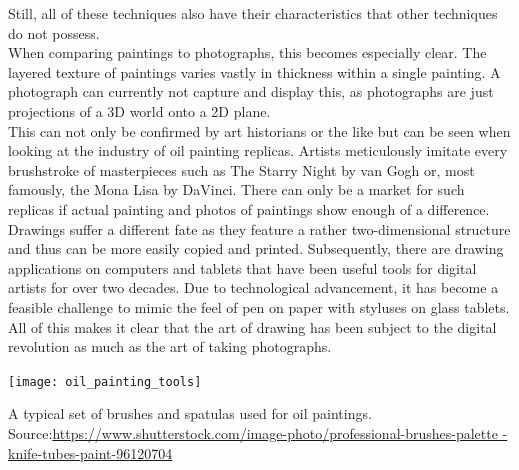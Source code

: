 Still, all of these techniques also have their characteristics that other techniques do not possess. \\
When comparing paintings to photographs, this becomes especially clear.
The layered texture of paintings varies vastly in thickness within a single painting.
A photograph can currently not capture and display this, as photographs are just projections of a 3D world onto a 2D plane.\\
This can not only be confirmed by art historians or the like but can be seen when looking at the industry of oil painting replicas.
Artists meticulously imitate every brushstroke of masterpieces such as The Starry Night by van Gogh or, most famously, the Mona Lisa by DaVinci.
There can only be a market for such replicas if actual painting and photos of paintings show enough of a difference.\\
Drawings suffer a different fate as they feature a rather two-dimensional structure and thus can be more easily copied and printed.
Subsequently, there are drawing applications on computers and tablets that have been useful tools for digital artists for over two decades.
Due to technological advancement, it has become a feasible challenge to mimic the feel of pen on paper with styluses on glass tablets.\\
All of this makes it clear that the art of drawing has been subject to the digital revolution as much as the art of taking photographs.
\begin{marginfigure}
    \texttt{[image: oil\_painting\_tools]}
    \caption{A typical set of brushes and spatulas used for oil paintings. Source:\url{https://www.shutterstock.com/image-photo/professional-brushes-palette -knife-tubes-paint-96120704}}
\end{marginfigure}

